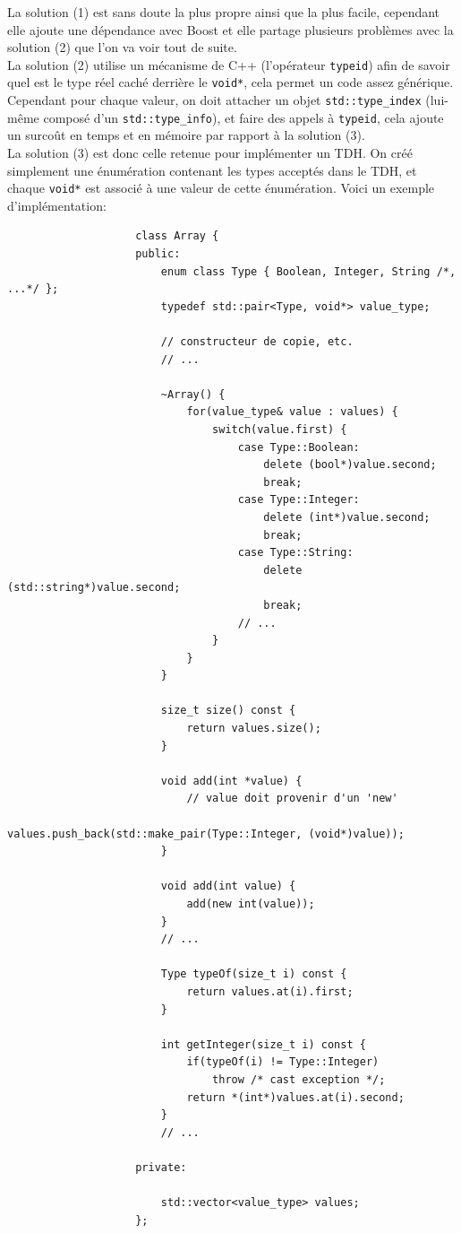 \documentclass[french]{article}
\begin{document}
				La solution (1) est sans doute la plus propre ainsi que la plus facile, cependant elle ajoute une dépendance avec Boost et elle partage plusieurs problèmes avec la solution (2) que l'on va voir tout de suite.\\
				
				La solution (2) utilise un mécanisme de C++ (l'opérateur \texttt{typeid}) afin de savoir quel est le type réel caché derrière le \texttt{void*}, cela permet un code assez générique. Cependant pour chaque valeur, on doit attacher un objet \texttt{std::type\_index} (lui-même composé d'un \texttt{std::type\_info}), et faire des appels à \texttt{typeid}, cela ajoute un surcoût en temps et en mémoire par rapport à la solution (3).\\
				
				La solution (3) est donc celle retenue pour implémenter un TDH. On créé simplement une énumération contenant les types acceptés dans le TDH, et chaque \texttt{void*} est associé à une valeur de cette énumération. Voici un exemple d'implémentation:
				
				\begin{lstlisting}
					class Array {
					public:
						enum class Type { Boolean, Integer, String /*, ...*/ };
						typedef std::pair<Type, void*> value_type;
						
						// constructeur de copie, etc.
						// ...
						
						~Array() {
							for(value_type& value : values) {
								switch(value.first) {
									case Type::Boolean:
										delete (bool*)value.second;
										break;
									case Type::Integer:
										delete (int*)value.second;
										break;
									case Type::String:
										delete (std::string*)value.second;
										break;
									// ...
								}
							}
						}
						
						size_t size() const {
							return values.size();
						}
						
						void add(int *value) { 
							// value doit provenir d'un 'new'
							values.push_back(std::make_pair(Type::Integer, (void*)value));
						}
						
						void add(int value) {
							add(new int(value));
						}
						// ...
						
						Type typeOf(size_t i) const {
							return values.at(i).first;
						}
						
						int getInteger(size_t i) const {
							if(typeOf(i) != Type::Integer)
								throw /* cast exception */;
							return *(int*)values.at(i).second;
						}
						// ...
						
					private:
					
						std::vector<value_type> values;
					};
				\end{lstlisting}
				
\end{document}
